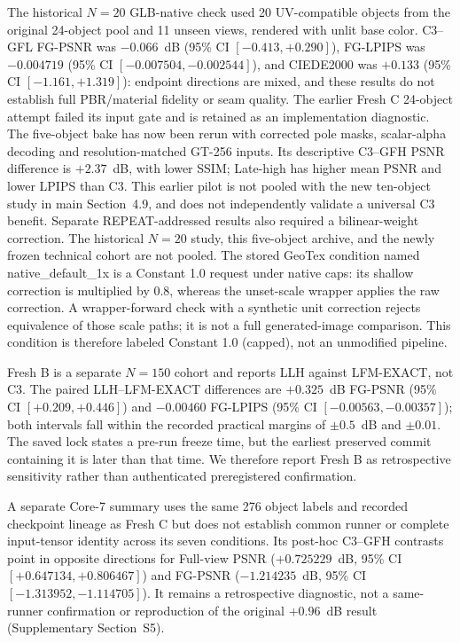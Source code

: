 \documentclass[11pt]{article}
\begin{document}
The historical $N=20$ GLB-native check used 20 UV-compatible objects from the original 24-object pool and 11 unseen views, rendered with unlit base color. C3--GFL FG-PSNR was $-0.066$~dB (95\% CI $[-0.413,+0.290]$), FG-LPIPS was $-0.004719$ (95\% CI $[-0.007504,-0.002544]$), and CIEDE2000 was $+0.133$ (95\% CI $[-1.161,+1.319]$): endpoint directions are mixed, and these results do not establish full PBR/material fidelity or seam quality. The earlier Fresh C 24-object attempt failed its input gate and is retained as an implementation diagnostic. The five-object bake has now been rerun with corrected pole masks, scalar-alpha decoding and resolution-matched GT-256 inputs. Its descriptive C3--GFH PSNR difference is $+2.37$~dB, with lower SSIM; Late-high has higher mean PSNR and lower LPIPS than C3. This earlier pilot is not pooled with the new ten-object study in main Section~4.9, and does not independently validate a universal C3 benefit. Separate REPEAT-addressed results also required a bilinear-weight correction. The historical $N=20$ study, this five-object archive, and the newly frozen technical cohort are not pooled. The stored GeoTex condition named native\_default\_1x is a Constant 1.0 request under native caps: its shallow correction is multiplied by 0.8, whereas the unset-scale wrapper applies the raw correction. A wrapper-forward check with a synthetic unit correction rejects equivalence of those scale paths; it is not a full generated-image comparison. This condition is therefore labeled Constant 1.0 (capped), not an unmodified pipeline.

Fresh B is a separate $N=150$ cohort and reports LLH against LFM-EXACT, not C3. The paired LLH--LFM-EXACT differences are $+0.325$~dB FG-PSNR (95\% CI $[+0.209,+0.446]$) and $-0.00460$ FG-LPIPS (95\% CI $[-0.00563,-0.00357]$); both intervals fall within the recorded practical margins of $\pm0.5$~dB and $\pm0.01$. The saved lock states a pre-run freeze time, but the earliest preserved commit containing it is later than that time. We therefore report Fresh B as retrospective sensitivity rather than authenticated preregistered confirmation.

A separate Core-7 summary uses the same 276 object labels and recorded checkpoint lineage as Fresh C but does not establish common runner or complete input-tensor identity across its seven conditions. Its post-hoc C3--GFH contrasts point in opposite directions for Full-view PSNR ($+0.725229$~dB, 95\% CI $[+0.647134,+0.806467]$) and FG-PSNR ($-1.214235$~dB, 95\% CI $[-1.313952,-1.114705]$). It remains a retrospective diagnostic, not a same-runner confirmation or reproduction of the original $+0.96$~dB result (Supplementary Section~S5).
\end{document}
